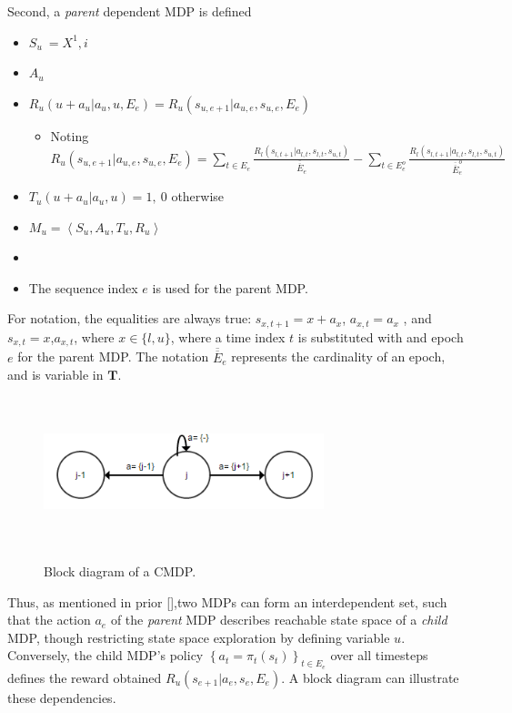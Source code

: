 \documentclass[compsoc,journal,letterpaper,10pt,draftclsnofoot,onecolumn]{IEEEtran}
\begin{document}
Second, a \emph{parent} dependent MDP is defined

\begin{itemize}
\item
  \(S_{u}\  = X^{1},i\)
\item
  \(A_{u}\)
\item
  \(R_{u}\left( u + a_{u}|a_{u},u,E_{e} \right) = R_{u}\left( s_{u,e + 1}|a_{u,e},s_{u,e},E_{e} \right)\)

  \begin{itemize}
  \item
    Noting
    \(R_{u}\left( s_{u,e + 1}|a_{u,e}, s_{u,e}, E_{e} \right) = \sum_{t \in E_{e}}^{\ }\frac{R_{l}\left( s_{l,t + 1}|a_{l,t}, s_{l,t}, s_{u,t} \right)}{\overline{\overline E}_{e}} - \sum_{t \in E_{e}^{o}}^{\ }\frac{R_{l}\left( s_{l,t + 1}|a_{l,t},s_{l,t},s_{u,t} \right)}{\overline{\overline E}_{e}^{o}}\)
  \end{itemize}
\item
  \(T_{u}\left( u + a_{u}|a_{u}, u \right) = 1,\ 0\) otherwise
\item
  \(M_{u} = \left\langle S_{u}, A_{u}, T_{u}, R_{u} \right\rangle\)
\item
\item
  The sequence index \(e\) is used for the parent MDP.
\end{itemize}

For notation, the equalities are always true:
\(s_{x,t + 1} = x + a_{x}\), \(a_{x,t} = a_{x}\) ,
and\(s_{x,t} = x\),\(a_{x,t}\), where \(x \in \{ l,u\}\), where a time
index \(t\) is substituted with and epoch \(e\) for the parent MDP. The
notation \(\overline{\overline E}_{e}\) represents the cardinality of an epoch,
and is variable in \(\mathbf{T}\).

\begin{figure}
\includegraphics[width=3.20833in,height=1.70208in]{media/image3.png}\\
\caption{\label{fig:figure3}Block diagram of a CMDP.}
\end{figure}

Thus,
as mentioned in prior {[}{]},two MDPs can form an interdependent set,
such that the action \(a_{e}\) of the \emph{parent} MDP describes
reachable state space of a \emph{child} MDP, though restricting state
space exploration by defining variable \(u\). Conversely, the child
MDP's policy
\(\left\{ a_{t} = \pi_{t}(s_{t}) \right\}_{t \in E_{e}}^{\ }\) over all
timesteps defines the reward obtained
\(R_{u}\left( s_{e + 1}|a_{e},s_{e},E_{e} \right)\). A block diagram can
illustrate these dependencies.
\end{document}
